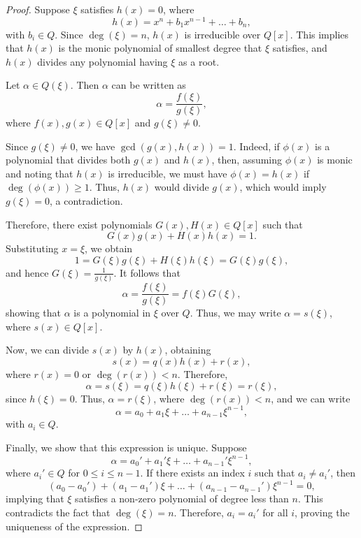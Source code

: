 \documentclass{article}
\begin{document}
\begin{proof}
    Suppose $\xi$ satisfies $h(x) = 0$, where
    \[
    h(x) = x^n + b_1 x^{n-1} + \dots + b_n,
    \]
    with $b_i \in Q$. Since $\deg(\xi) = n$, $h(x)$ is irreducible over $Q[x]$. This implies that $h(x)$ is the monic polynomial of smallest degree that $\xi$ satisfies, and $h(x)$ divides any polynomial having $\xi$ as a root.
    
    Let $\alpha \in Q(\xi)$. Then $\alpha$ can be written as
    \[
    \alpha = \frac{f(\xi)}{g(\xi)},
    \]
    where $f(x), g(x) \in Q[x]$ and $g(\xi) \neq 0$.
    
    Since $g(\xi) \neq 0$, we have $\gcd(g(x), h(x)) = 1$. Indeed, if $\phi(x)$ is a polynomial that divides both $g(x)$ and $h(x)$, then, assuming $\phi(x)$ is monic and noting that $h(x)$ is irreducible, we must have $\phi(x) = h(x)$ if $\deg(\phi(x)) \geq 1$. Thus, $h(x)$ would divide $g(x)$, which would imply $g(\xi) = 0$, a contradiction.
    
    Therefore, there exist polynomials $G(x), H(x) \in Q[x]$ such that
    \[
    G(x)g(x) + H(x)h(x) = 1.
    \]
    Substituting $x = \xi$, we obtain
    \[
    1 = G(\xi)g(\xi) + H(\xi)h(\xi) = G(\xi)g(\xi),
    \]
    and hence $G(\xi) = \frac{1}{g(\xi)}$. It follows that
    \[
    \alpha = \frac{f(\xi)}{g(\xi)} = f(\xi)G(\xi),
    \]
    showing that $\alpha$ is a polynomial in $\xi$ over $Q$. Thus, we may write $\alpha = s(\xi)$, where $s(x) \in Q[x]$.
    
    Now, we can divide $s(x)$ by $h(x)$, obtaining
    \[
    s(x) = q(x)h(x) + r(x),
    \]
    where $r(x) = 0$ or $\deg(r(x)) < n$. Therefore,
    \[
    \alpha = s(\xi) = q(\xi)h(\xi) + r(\xi) = r(\xi),
    \]
    since $h(\xi) = 0$. Thus, $\alpha = r(\xi)$, where $\deg(r(x)) < n$, and we can write
    \[
    \alpha = a_0 + a_1 \xi + \dots + a_{n-1} \xi^{n-1},
    \]
    with $a_i \in Q$.
    
    Finally, we show that this expression is unique. Suppose
    \[
    \alpha = a_0' + a_1' \xi + \dots + a_{n-1}' \xi^{n-1},
    \]
    where $a_i' \in Q$ for $0 \leq i \leq n - 1$. If there exists an index $i$ such that $a_i \neq a_i'$, then
    \[
    (a_0 - a_0') + (a_1 - a_1') \xi + \dots + (a_{n-1} - a_{n-1}') \xi^{n-1} = 0,
    \]
    implying that $\xi$ satisfies a non-zero polynomial of degree less than $n$. This contradicts the fact that $\deg(\xi) = n$. Therefore, $a_i = a_i'$ for all $i$, proving the uniqueness of the expression.
\end{proof}
\end{document}

